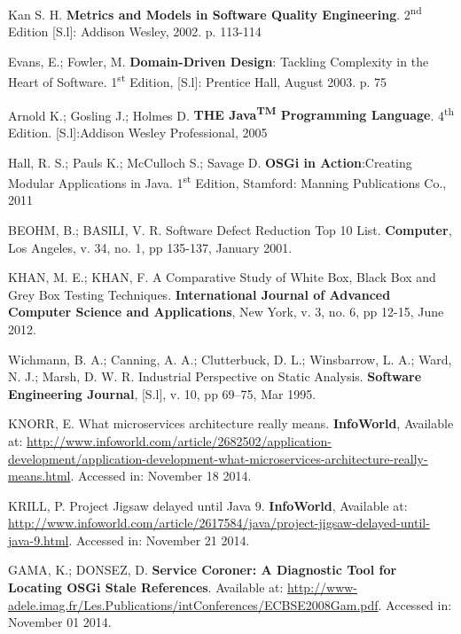 \documentclass[cic,tc,english]{iiufrgs} %
\newcommand{\ts}{\textsuperscript}
\begin{document}
\begin{thebibliography}{este-parametro-nao-eh-usado-pelo-estilo-ABNT}

 Kan S. H.
\textbf{Metrics and Models in Software Quality Engineering}. 2\ts{nd} Edition [S.l]: Addison Wesley, 2002. p. 113-114

 Evans, E.; Fowler, M.
\textbf{Domain-Driven Design}: Tackling Complexity in the Heart of Software. 1\ts{st} Edition, [S.l]: Prentice Hall, August 2003. p. 75 

 Arnold K.; Gosling J.; Holmes D.
\textbf{THE Java\ts{TM} Programming Language}. 4\ts{th} Edition. [S.l]:Addison Wesley Professional, 2005

 Hall, R. S.; Pauls K.; McCulloch S.; Savage D.
\textbf{OSGi in Action}:Creating Modular Applications in Java. 1\ts{st} Edition, Stamford: Manning Publications Co., 2011


 BEOHM, B.; BASILI, V. R.
Software Defect Reduction Top 10 List. \textbf{Computer}, Los Angeles, v. 34, no. 1, pp 135-137, January 2001.

 KHAN, M. E.; KHAN, F.
A Comparative Study of White Box, Black Box and Grey Box Testing Techniques. \textbf{International Journal of Advanced Computer Science and Applications}, New York, v. 3, no. 6, pp 12-15, June 2012.

Wichmann, B. A.; Canning, A. A.; Clutterbuck, D. L.; Winsbarrow, L. A.; Ward, N. J.; Marsh, D. W. R.
Industrial Perspective on Static Analysis. \textbf{Software Engineering Journal}, [S.l], v. 10, pp 69–75, Mar 1995.

 KNORR, E.
What microservices architecture really means. \textbf{InfoWorld}, Available at: \url{http://www.infoworld.com/article/2682502/application-development/application-development-what-microservices-architecture-really-means.html}. Accessed in: November 18 2014.

 KRILL, P.
Project Jigsaw delayed until Java 9. \textbf{InfoWorld}, Available at: \url{http://www.infoworld.com/article/2617584/java/project-jigsaw-delayed-until-java-9.html}. Accessed in: November 21 2014.

 GAMA, K.; DONSEZ, D.
\textbf{Service Coroner: A Diagnostic Tool for Locating OSGi Stale References}. Available at: \url{http://www-adele.imag.fr/Les.Publications/intConferences/ECBSE2008Gam.pdf}. Accessed in: November 01 2014.


\end{thebibliography}
\end{document}
